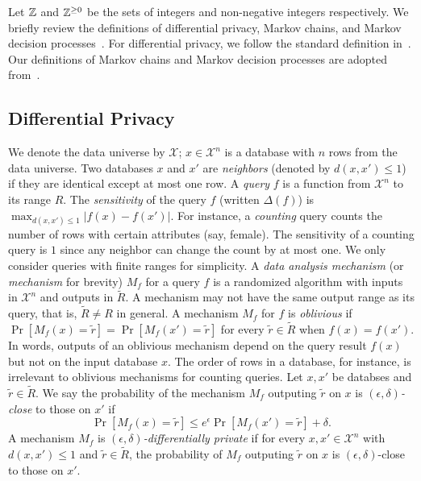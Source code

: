 
Let $\mathbb{Z}$ and $\mathbb{Z}^{\geq 0}$ be the sets of integers and
non-negative integers respectively.
We briefly review the definitions of differential privacy, Markov
chains, and Markov decision processes~\cite{Put05}. For differential privacy, we
follow the standard definition in~\cite{DR:14:AFDP,GRS:09:UUPM,GRS:12:UUPM}. Our
definitions of Markov chains and Markov decision processes are adopted
from~\cite{BK:08:PMC}.

\subsection{Differential Privacy}
We denote the data universe by $\mathcal{X}$; $x \in \mathcal{X}^n$ is
a database with $n$ rows from the data universe. Two databases $x$ and
$x'$ are \emph{neighbors} (denoted by $d(x, x') \leq 1$) if they are
identical except at most one row. A \emph{query} $f$ is a function
from $\mathcal{X}^n$ to its range $R$. The \emph{sensitivity} of the
query $f$ (written $\Delta (f)$) is $\max_{d(x, x') \leq 1} | f (x) -
f (x') |$. For instance, a \emph{counting} query counts the number
of rows with certain attributes (say, female). The sensitivity of a
counting query is $1$ since any neighbor can change the count by at
most one. We only consider queries with finite  ranges for simplicity.
A \emph{data analysis mechanism} (or
\emph{mechanism} for brevity) $M_f$ for a query $f$
is a randomized algorithm with inputs in $\mathcal{X}^n$ and outputs
in $\tilde{R}$.
A mechanism may not have the same output range as its query, that is,
$\tilde{R} \neq R$ in general.
A mechanism $M_f$ for $f$ is \emph{oblivious} if
$\Pr[M_f(x) = \tilde{r}] = \Pr[M_f(x') = \tilde{r}]$ for every
$\tilde{r} \in \tilde{R}$ when $f (x) = f (x')$. In words, outputs of an
oblivious mechanism depend on the query result $f (x)$ but not on the
input database $x$. The order of rows in a database, for instance, is
irrelevant to oblivious mechanisms for counting queries. Let $x, x'$
be databses and $\tilde{r} \in \tilde{R}$. We say the probability of
the mechanism $M_f$ outputing $\tilde{r}$ on $x$ is
\emph{$(\epsilon, \delta)$-close} to those on $x'$ if
\[
\Pr[M_f (x) = \tilde{r}] \leq e^{\epsilon} \Pr[M_f (x') =
\tilde{r}] + \delta.
\]
A mechanism $M_f$ is \emph{$(\epsilon, \delta)$-differentially
  private} %
if for every $x, x' \in \mathcal{X}^n$ with $d(x, x') \leq 1$
and $\tilde{r} \in \tilde{R}$, the probability of
$M_f$ outputing $\tilde{r}$ on $x$ is $(\epsilon, \delta)$-close to
those on $x'$.

